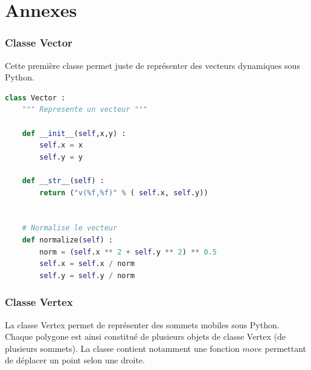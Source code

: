 \documentclass[a4paper,reqno]{article}
\begin{document}
\newpage






\part*{Annexes}


\section*{Classe Vector}

Cette première classe permet juste de représenter des vecteurs dynamiques sous Python.


\begin{lstlisting}[language=Python,frame=single,caption=Création de la classe Vecteur]
class Vector : 
    """ Represente un vecteur """
    
    def __init__(self,x,y) : 
        self.x = x 
        self.y = y 
        
    def __str__(self) : 
        return ("v(%f,%f)" % ( self.x, self.y))
        
        
    # Normalise le vecteur 
    def normalize(self) : 
        norm = (self.x ** 2 + self.y ** 2) ** 0.5
        self.x = self.x / norm 
        self.y = self.y / norm 
\end{lstlisting}



\section*{Classe Vertex}

La classe Vertex permet de représenter des sommets mobiles sous Python. Chaque polygone est ainsi constitué de plusieurs objets de classe Vertex (de plusieurs sommets). La classe contient notamment une fonction $move$ permettant de déplacer un point selon une droite.
\end{document}
